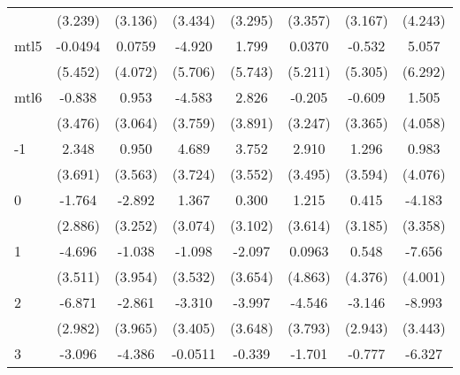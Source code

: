 \documentclass{article}
\begin{document}
{\begin{longtable}{l*{7}{c}}
                &  (3.239)         &  (3.136)         &  (3.434)         &  (3.295)         &  (3.357)         &  (3.167)         &  (4.243)         \\
mtl5            &  -0.0494         &   0.0759         &   -4.920         &    1.799         &   0.0370         &   -0.532         &    5.057         \\
                &  (5.452)         &  (4.072)         &  (5.706)         &  (5.743)         &  (5.211)         &  (5.305)         &  (6.292)         \\
mtl6            &   -0.838         &    0.953         &   -4.583         &    2.826         &   -0.205         &   -0.609         &    1.505         \\
                &  (3.476)         &  (3.064)         &  (3.759)         &  (3.891)         &  (3.247)         &  (3.365)         &  (4.058)         \\
-1              &    2.348         &    0.950         &    4.689         &    3.752         &    2.910         &    1.296         &    0.983         \\
                &  (3.691)         &  (3.563)         &  (3.724)         &  (3.552)         &  (3.495)         &  (3.594)         &  (4.076)         \\
0               &   -1.764         &   -2.892         &    1.367         &    0.300         &    1.215         &    0.415         &   -4.183         \\
                &  (2.886)         &  (3.252)         &  (3.074)         &  (3.102)         &  (3.614)         &  (3.185)         &  (3.358)         \\
1               &   -4.696         &   -1.038         &   -1.098         &   -2.097         &   0.0963         &    0.548         &   -7.656         \\
                &  (3.511)         &  (3.954)         &  (3.532)         &  (3.654)         &  (4.863)         &  (4.376)         &  (4.001)         \\
2               &   -6.871\sym{*}  &   -2.861         &   -3.310         &   -3.997         &   -4.546         &   -3.146         &   -8.993\sym{*}  \\
                &  (2.982)         &  (3.965)         &  (3.405)         &  (3.648)         &  (3.793)         &  (2.943)         &  (3.443)         \\
3               &   -3.096         &   -4.386         &  -0.0511         &   -0.339         &   -1.701         &   -0.777         &   -6.327         \\

\end{longtable}}
\end{document}
